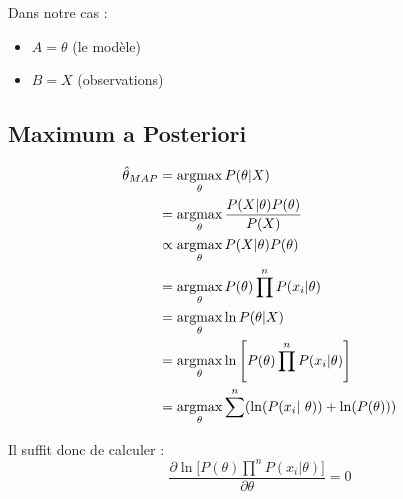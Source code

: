 \documentclass{article}
\begin{document}
Dans notre cas :
\begin{itemize}
    \item $A = \theta$ (le modèle)
    \item $B = X$ (observations)
\end{itemize}


\subsection{Maximum a Posteriori}

\begin{align*}
    \hat\theta_{MAP} & = \argmax\limits_{\theta} P(\theta | X) \\
    & = \argmax\limits_{\theta} \frac{P(X | \theta)P(\theta)}{P(X)} \\
    & \propto \argmax\limits_{\theta} P(X | \theta)P(\theta) \\
    & = \argmax\limits_{\theta} P(\theta) \prod\limits^n P(x_i | \theta) \\
    & = \argmax\limits_{\theta} \ln P(\theta | X) \\
    & = \argmax\limits_{\theta} \ln \Bigg[ P(\theta) \prod\limits^n P(x_i | \theta) \Bigg] \\
    & = \argmax\limits_{\theta} \sum\limits^n (\ln(P(x_i | \theta)) + \ln(P(\theta)))
\end{align*}

Il suffit donc de calculer : 
\begin{equation*}
    \frac{
        \partial \ln \Bigg[ P(\theta) \prod\limits^n P(x_i | \theta) \Bigg]
    }{
        \partial \theta
    } = 0
\end{equation*}
\end{document}
